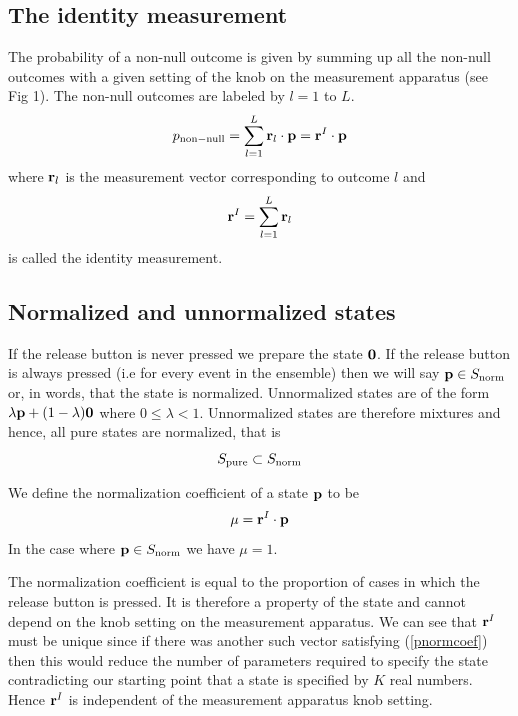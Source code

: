 \documentclass[10pt,twocolumn]{article}
\begin{document}
\subsection{The identity measurement}

The probability of a non-null outcome is given by summing up all the
non-null outcomes with a given setting of the knob on the measurement
apparatus (see Fig 1).  The non-null outcomes are labeled by $l=1$ to
$L$.
\begin{equation}\label{nonnull}
p_{\rm non-null} = \sum_{l=1}^L {\bf r}_l \cdot {\bf p}
={\bf r}^I \cdot {\bf p}
\end{equation}
where ${\bf r}_l$ is the measurement vector corresponding to outcome
$l$ and
\begin{equation}\label{identM}
{\bf r}^I = \sum_{l=1}^L {\bf r}_l
\end{equation}
is called the identity measurement.

\subsection{Normalized and unnormalized states}

If the release button is never pressed we prepare the state $\bf 0$.
If the release button is always pressed (i.e for every event in the
ensemble) then we will say ${\bf p}\in S_{\rm norm}$ or, in words, that the
state is normalized.
Unnormalized states are of the form $\lambda {\bf p} +(1-\lambda) {\bf
0}$ where $0\leq \lambda < 1$.  Unnormalized states are therefore
mixtures and hence, all pure states are normalized, that is
\[ S_{\rm pure} \subset S_{\rm norm}  \]

We define the normalization coefficient of a state ${\bf p}$ to be
\begin{equation}\label{pnormcoef}
     \mu = {\bf r}^I\cdot {\bf p}
\end{equation}
In the case where ${\bf p} \in S_{\rm norm}$ we have $\mu=1$.

The normalization coefficient is equal to the proportion of cases in
which the release button is pressed.  It is therefore a property of the
state and cannot depend on the knob setting on the measurement
apparatus.   We can see that ${\bf r}^I$ must be unique since if there
was another such vector satisfying (\ref{pnormcoef}) then this would
reduce the number of parameters required to specify the state
contradicting our starting point that a state is specified by $K$
real numbers. Hence ${\bf r}^I$ is independent of the measurement apparatus
knob setting.
\end{document}
